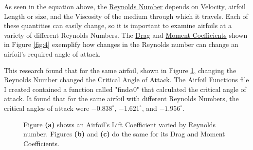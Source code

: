 \documentclass{article}
\begin{document}
As seen in the equation above, the \hyperlink{Re}{Reynolds Number} depends on Velocity, airfoil Length or size, and the Viscosity of the medium through which it travels. Each of these quantities can easily change, so it is important to examine airfoils at a variety of different Reynolds Numbers. The \hyperlink{CD}{Drag} and \hyperlink{CM}{Moment Coefficients} shown in Figure \ref{fig:4} exemplify how changes in the Reynolds number can change an airfoil's required angle of attack. \newline

This research found that for the same airfoil, shown in Figure \ref{fig:3}, changing the \hyperlink{Re}{Reynolds Number} changed the Critical \hyperlink{alpha}{Angle of Attack}. The Airfoil Functions file I created contained a function called "find$\alpha$0" that calculated the critical angle of attack. It found that for the same airfoil with different  Reynolds Numbers, the critical angles of attack were $-0.838^{\circ}$, $-1.621^{\circ}$, and $-1.956^{\circ}$. \newline

\begin{figure}[!htb]
  \centering
  \caption{Figure \textbf{(a)} shows an Airfoil's Lift Coefficient varied by Reynolds number. Figures \textbf{(b)} and \textbf{(c)} do the same for its Drag and Moment Coefficients.}
  \label{fig:3}
\end{figure}
\end{document}
